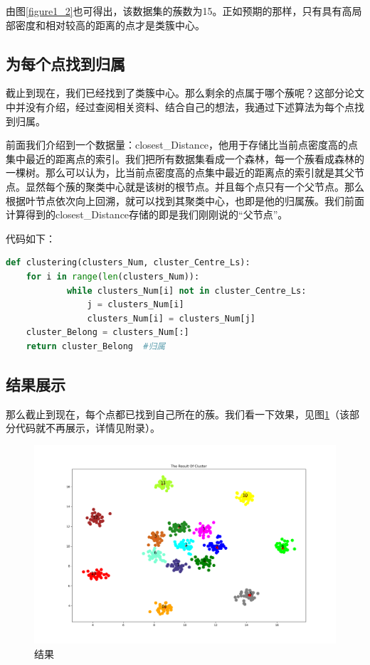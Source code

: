 由图\ref{figure1_2}也可得出，该数据集的蔟数为15。正如预期的那样，只有具有高局部密度和相对较高的距离的点才是类簇中心。

\subsection{为每个点找到归属}
截止到现在，我们已经找到了类簇中心。那么剩余的点属于哪个蔟呢？这部分论文中并没有介绍，经过查阅相关资料、结合自己的想法，我通过下述算法为每个点找到归属。

前面我们介绍到一个数据量：closest\_Distance，他用于存储比当前点密度高的点集中最近的距离点的索引。我们把所有数据集看成一个森林，每一个蔟看成森林的一棵树。那么可以认为，比当前点密度高的点集中最近的距离点的索引就是其父节点。显然每个蔟的聚类中心就是该树的根节点。并且每个点只有一个父节点。那么根据叶节点依次向上回溯，就可以找到其聚类中心，也即是他的归属蔟。我们前面计算得到的closest\_Distance存储的即是我们刚刚说的“父节点”。

代码如下：
\begin{lstlisting}[language=python]
def clustering(clusters_Num, cluster_Centre_Ls):
    for i in range(len(clusters_Num)):
            while clusters_Num[i] not in cluster_Centre_Ls:
                j = clusters_Num[i]
                clusters_Num[i] = clusters_Num[j]
    cluster_Belong = clusters_Num[:]
    return cluster_Belong  #归属
\end{lstlisting}
\subsection{结果展示}
那么截止到现在，每个点都已找到自己所在的蔟。我们看一下效果，见图\ref{figure1_3}（该部分代码就不再展示，详情见附录）。


\begin{figure}[ht]
\centering
\includegraphics[scale=0.45]{figure/1_3.png}%
\caption{结果}
\label{figure1_3}
\end{figure}

